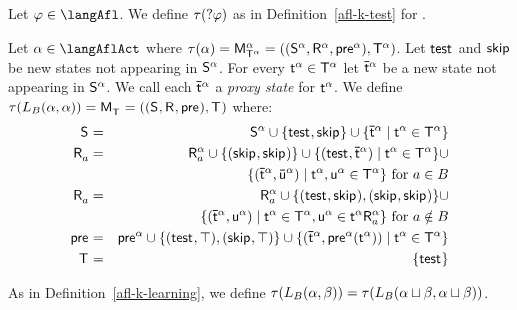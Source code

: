 \subsection{\classKFF{}}

\begin{definition}[Test]\label{afl-kff-test}
Let $\phi \in \langAfl$.
We define $\tau(\test{\phi})$ as in Definition~\ref{afl-k-test} for \classK{}.
\end{definition}

\begin{definition}[Learning]\label{afl-kff-learning}
Let $\alpha \in \langAflAct$ where $\tau(\alpha) = \aPModel[\alpha]{\aStatesT[\alpha]} = \aPModelTuple[\alpha]{\aStatesT[\alpha]}$.
Let $\aStateTest$ and $\aStateSkip$ be new states not appearing in $\aStates[\alpha]$.
For every $\aStateT[\alpha] \in \aStatesT[\alpha]$ let $\aPStateT[\alpha]$ be a new state not appearing in $\aStates[\alpha]$.
We call each $\aPStateT[\alpha]$ a {\em proxy state} for $\aStateT[\alpha]$.
We define $\tau(\learns_\agentsB (\alpha, \alpha)) = \aPModel{\aStatesT} = \aPModelTuple{\aStatesT}$ where:
\begin{eqnarray*}
    \aStates &=& \aStates[\alpha] \cup \{\aStateTest, \aStateSkip\} \cup \{\aPStateT[\alpha] \mid \aStateT[\alpha] \in \aStatesT[\alpha]\}\\
    \aAccessibility{\agentA} &=& \aAccessibility[\alpha]{\agentA} \cup \{(\aStateSkip, \aStateSkip)\} \cup \{(\aStateTest, \aPStateT[\alpha]) \mid \aStateT[\alpha] \in \aStatesT[\alpha]\} \cup \\&& \quad \{(\aPStateT[\alpha], \aPStateU[\alpha]) \mid \aStateT[\alpha], \aStateU[\alpha] \in \aStatesT[\alpha]\} \text{ for } \agentA \in \agentsB\\
    \aAccessibility{\agentA} &=& \aAccessibility[\alpha]{\agentA} \cup \{(\aStateTest, \aStateSkip), (\aStateSkip, \aStateSkip)\} \cup\\&& \quad \{(\aPStateT[\alpha], \aStateU[\alpha]) \mid \aStateT[\alpha] \in \aStatesT[\alpha], \aStateU[\alpha] \in \aStateT[\alpha] \aAccessibility[\alpha]{\agentA} \} \text{ for } \agentA \notin \agentsB\\
    \aPrecondition &=& \aPrecondition[\alpha] \cup \{(\aStateTest, \top), (\aStateSkip, \top)\} \cup \{(\aPStateT[\alpha], \aPrecondition[\alpha](\aStateT[\alpha])) \mid \aStateT[\alpha] \in \aStatesT[\alpha]\}\\
    \aStatesT &=& \{\aStateTest\}
\end{eqnarray*}

As in Definition~\ref{afl-k-learning}, we define $\tau(\learns_\agentsB (\alpha, \beta)) = \tau(\learns_\agentsB (\alpha \choice \beta, \alpha \choice \beta))$.
\end{definition}

